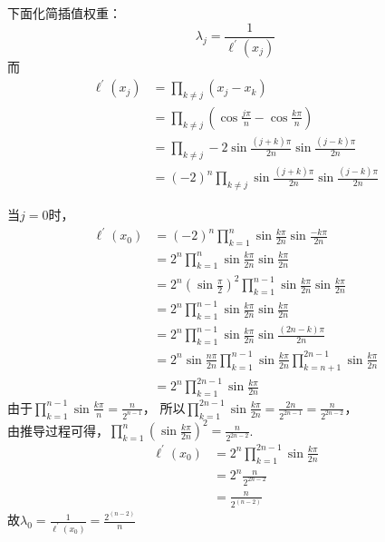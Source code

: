 \documentclass[12pt,a4paper,utf8]{ctexart}
\begin{document}
\begin{enumerate}
下面化简插值权重：
\begin{equation}
   \lambda_j=\frac{1}{\ell^{'}(x_j)}
\end{equation}
而
\begin{equation}
   \begin{aligned}
      \ell^{'}(x_j)&=\prod_{k\ne j}(x_j-x_k)\\
      &=\prod_{k \ne j}(\cos\frac{j\pi}{n}-\cos\frac{k\pi}{n})\\
      &=\prod_{k \ne j}-2\sin\frac{(j+k)\pi}{2n}\sin\frac{(j-k)\pi}{2n}\\
      &=(-2)^n\prod_{k \ne j}\sin\frac{(j+k)\pi}{2n}\sin\frac{(j-k)\pi}{2n}
   \end{aligned}
\end{equation}

当$j=0$时，
\begin{equation}
   \begin{aligned}
      \ell^{'}(x_0)&=(-2)^n\prod_{k=1}^n\sin\frac{k\pi}{2n}\sin\frac{-k\pi}{2n}\\
      &=2^n\prod_{k=1}^n\sin\frac{k\pi}{2n}\sin\frac{k\pi}{2n}\\
      &=2^n(\sin\frac{\pi}{2})^2\prod_{k=1}^{n-1}\sin\frac{k\pi}{2n}\sin\frac{k\pi}{2n}\\
      &=2^n\prod_{k=1}^{n-1}\sin\frac{k\pi}{2n}\sin\frac{k\pi}{2n}\\
      &=2^n\prod_{k=1}^{n-1}\sin\frac{k\pi}{2n}\sin\frac{(2n-k)\pi}{2n}\\
      &=2^n\sin\frac{n\pi}{2n}\prod_{k=1}^{n-1}\sin\frac{k\pi}{2n}\prod_{k=n+1}^{2n-1}\sin\frac{k\pi}{2n}\\
      &=2^n\prod_{k=1}^{2n-1}\sin\frac{k\pi}{2n}
   \end{aligned}
\end{equation}
由于$\prod\limits_{k=1}^{n-1}\sin\frac{k\pi}{n}=\frac{n}{2^{n-1}}$，
所以$\prod\limits_{k=1}^{2n-1}\sin\frac{k\pi}{2n}=\frac{2n}{2^{2n-1}}=\frac{n}{2^{2n-2}}$，\\
由推导过程可得，$\prod_{k=1}^n(\sin\frac{k\pi}{2n})^2=\frac{n}{2^{2n-2}}$.\\
\begin{equation}
   \begin{aligned}
      \ell^{'}(x_0)&=2^n\prod_{k=1}^{2n-1}\sin\frac{k\pi}{2n}\\
      &=2^n\frac{n}{2^{2n-2}}\\
      &=\frac{n}{2^(n-2)}
   \end{aligned}
\end{equation}
故$\lambda_0=\frac{1}{\ell^{'}(x_0)}=\frac{2^{(n-2)}}{n}$\\


\end{enumerate}
\end{document}
